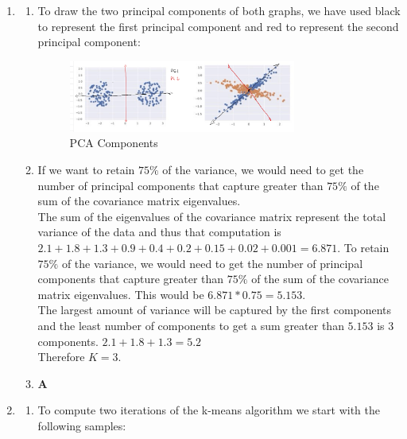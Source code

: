 \documentclass[12pt]{article}
\begin{document}
\begin{enumerate}
\item 
\begin{enumerate}
\item To draw the two principal components of both graphs, we have used black to represent the first principal component and red to represent the second principal component: \\ 

\begin{figure}[H]
  \centering 
  \includegraphics[width=0.75\textwidth]{1a.jpeg}
  \caption{PCA Components}
\end{figure}


\item If we want to retain $75\%$ of the variance, we would need to get the number of principal components that capture greater than $75\%$ of the sum of the covariance matrix eigenvalues. \\ 

The sum of the eigenvalues of the covariance matrix represent the total variance of the data and thus that computation is $2.1 + 1.8 + 1.3 + 0.9 + 0.4 + 0.2 + 0.15 + 0.02 + 0.001 = 6.871$. To retain $75\%$ of the variance, we would need to get the number of principal components that capture greater than $75\%$ of the sum of the covariance matrix eigenvalues. This would be $6.871 * 0.75 = 5.153$. \\ 

The largest amount of variance will be captured by the first components and the least number of components to get a sum greater than $5.153$ is $3$ components. $2.1 + 1.8 + 1.3 = 5.2$ \\ 

Therefore $K = 3$. 


\item \textbf{A}
\end{enumerate}

\item
\begin{enumerate}
\item To compute two iterations of the k-means algorithm we start with the following samples: \\ 


\end{enumerate}
\end{enumerate}
\end{document}
